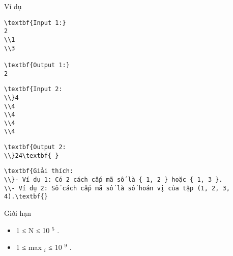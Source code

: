 Ví dụ
\begin{verbatim}
\textbf{Input 1:}
2
\\1
\\3

\textbf{Output 1:}
2\end{verbatim}
\begin{verbatim}
\textbf{Input 2:
\\}4
\\4
\\4
\\4
\\4 \end{verbatim}
\begin{verbatim}
\textbf{Output 2:
\\}24\textbf{ }\end{verbatim}
\begin{verbatim}
\textbf{Giải thích:
\\}- Ví dụ 1: Có 2 cách cấp mã số là { 1, 2 } hoặc { 1, 3 }.
\\- Ví dụ 2: Số cách cấp mã số là số hoán vị của tập (1, 2, 3, 4).\textbf{}\end{verbatim}
Giới hạn
\begin{itemize}
	\item     1 ≤ N ≤ 10    $^     5    $    .   
	\item     1 ≤ max    $_     i    $    ≤ 10    $^     9    $    .   
\end{itemize}